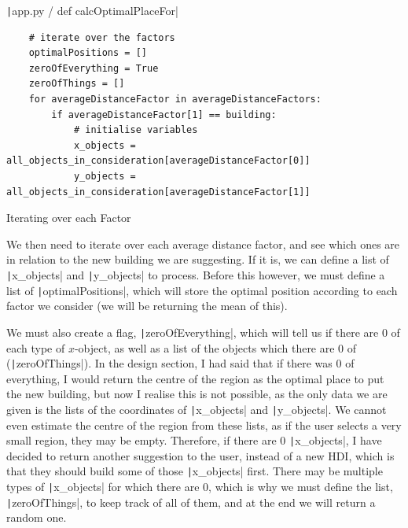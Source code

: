 \documentclass[12pt]{report}
\newcommand{\pil}[1]{\protect\texttt|#1|}
\begin{document}
\begin{listing}[H]
\pil{app.py / def calcOptimalPlaceFor}
\begin{verbatim}
    # iterate over the factors
    optimalPositions = []
    zeroOfEverything = True
    zeroOfThings = []
    for averageDistanceFactor in averageDistanceFactors:
        if averageDistanceFactor[1] == building:
            # initialise variables
            x_objects = all_objects_in_consideration[averageDistanceFactor[0]]
            y_objects = all_objects_in_consideration[averageDistanceFactor[1]]
\end{verbatim}
\caption{Iterating over each Factor}\label{cs:iteratingOverFactors}
\end{listing}

We then need to iterate over each average distance factor, and see which ones are in relation to the new building we are suggesting. If it is, we can define a list of \pil{x_objects} and \pil{y_objects} to process. Before this however, we must define a list of \pil{optimalPositions}, which will store the optimal position according to each factor we consider (we will be returning the mean of this).

We must also create a flag, \pil{zeroOfEverything}, which will tell us if there are 0 of each type of $x$-object, as well as a list of the objects which there are 0 of (\pil{zeroOfThings}). In the design section, I had said that if there was 0 of everything, I would return the centre of the region as the optimal place to put the new building, but now I realise this is not possible, as the only data we are given is the lists of the coordinates of \pil{x_objects} and \pil{y_objects}. We cannot even estimate the centre of the region from these lists, as if the user selects a very small region, they may be empty. Therefore, if there are 0 \pil{x_objects}, I have decided to return another suggestion to the user, instead of a new HDI, which is that they should build some of those \pil{x_objects} first. There may be multiple types of \pil{x_objects} for which there are 0, which is why we must define the list, \pil{zeroOfThings}, to keep track of all of them, and at the end we will return a random one.
\end{document}
